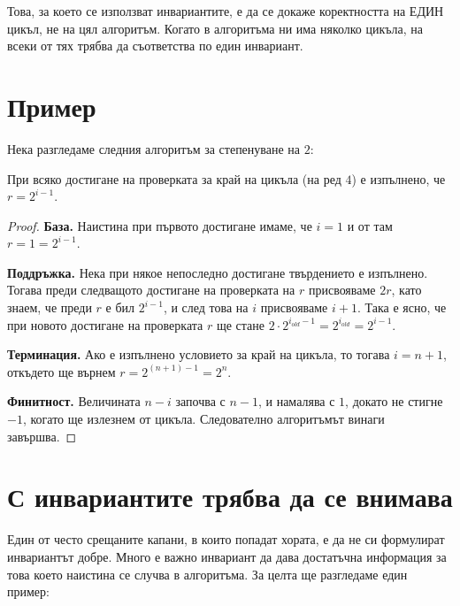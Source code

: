 \begin{warning}
    Това, за което се използват инвариантите, е да се докаже коректността на ЕДИН цикъл, не на цял алгоритъм.
    Когато в алгоритъма ни има няколко цикъла, на всеки от тях трябва да съответства по един инвариант.
\end{warning}

\section{Пример}

Нека разгледаме следния алгоритъм за степенуване на $2$:


\begin{invariant}
    При всяко достигане на проверката за край на цикъла (на ред $4$) е изпълнено, че $r = 2^{i - 1}$.
\end{invariant}
\begin{proof}
    \phantom{1}

    \textbf{База.}
    Наистина при първото достигане имаме, че $i = 1$ и от там $r = 1 = 2^{i - 1}$.

    \textbf{Поддръжка.}
    Нека при някое непоследно достигане твърдението е изпълнено.
    Тогава преди следващото достигане на проверката на $r$ присвояваме $2r$, като знаем, че преди $r$ е бил $2^{i - 1}$, и след това на $i$ присвояваме $i + 1$.
    Така е ясно, че при новото достигане на проверката $r$ ще стане $2 \cdot 2^{i_{old} - 1} = 2^{i_{old}} = 2^{i - 1}$.

    \textbf{Терминация.}
    Ако е изпълнено условието за край на цикъла, то тогава $i = n + 1$, откъдето ще върнем $r = 2^{(n + 1) - 1} = 2^n$.

    \textbf{Финитност.}
    Величината $n - i$ започва с $n - 1$, и намалява с $1$, докато не стигне $-1$, когато ще излезнем от цикъла.
    Следователно алгоритъмът винаги завършва.
\end{proof}

\section{С инвариантите трябва да се внимава}

Един от често срещаните капани, в които попадат хората, е да не си формулират инвариантът добре.
Много е важно инвариант да дава достатъчна информация за това което наистина се случва в алгоритъма.
За целта ще разгледаме един пример:


